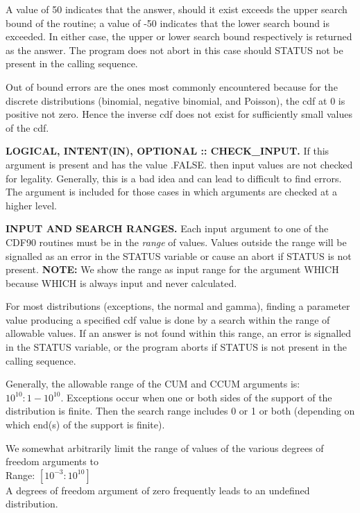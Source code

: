 \documentclass[12pt,dvips]{article}
\newcommand{\range}[2]{\hfill Range: \ensuremath{\left[ #1:#2
\right]}\\}
\newcommand{\myitem}[1]{\item{\bf \color{Violet} #1 \normalcolor}}
\begin{document}
\begin{description}
A value of  50 indicates that the answer, should  it exist exceeds the
upper search bound  of the routine; a value of  -50 indicates that the
lower search  bound is exceeded.  In  either case, the  upper or lower
search bound respectively is returned as the answer.  The program does
not abort  in this case  should STATUS not  be present in  the calling
sequence.

Out of bound errors are the ones most commonly encountered because for
the discrete distributions (binomial, negative binomial, and Poisson),
the cdf  at 0 is  positive not zero.   Hence the inverse cdf  does not
exist for sufficiently small values of the cdf.

\myitem{LOGICAL,  INTENT(IN),  OPTIONAL  ::  CHECK\_INPUT.}  If  this
argument is  present and has the  value .FALSE. then  input values are
not checked for legality.  Generally, this  is a bad idea and can lead
to difficult to find errors.  The argument is included for those cases
in which arguments are checked at a higher level.

\end{description}

{\bf  INPUT AND SEARCH  RANGES.}  Each  input argument  to one  of the
CDF90 routines must  be in the {\em range}  of values.  Values outside
the  range  will be signalled as an error  in the STATUS variable
or cause an abort if STATUS is not present.  {\bf NOTE:} We show the
range as input range for the argument WHICH because WHICH is always
input and never calculated.

For most  distributions (exceptions, the normal and  gamma), finding a
parameter value  producing a specified cdf  value is done  by a search
within  the range  of allowable  values.  If  an answer  is  not found
within this  range, an error is  signalled in the  STATUS variable, or
the program aborts if STATUS is not present in the calling sequence.

Generally,  the  allowable  range  of  the CUM  and  CCUM  arguments  is:
$10^{10}:1-10^{10}$.  Exceptions  occur when one  or both sides
of the support  of the distribution is finite.   Then the search range
includes 0  or 1  or both (depending  on which  end(s) of the  support is
finite).

We somewhat arbitrarily limit the range of values of the various
degrees of freedom arguments to\\
\range{10^{-3}}{10^{10}}
A degrees of freedom argument of zero frequently leads to an
undefined distribution.
\end{document}
